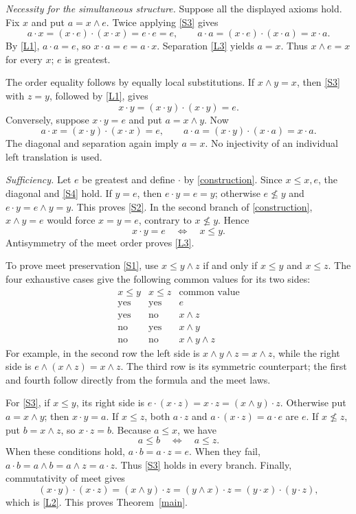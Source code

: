 \documentclass[11pt]{article}
\newcommand{\meet}{\wedge}
\newcommand{\dotop}{\mathbin{\cdot}}
\begin{document}
\medskip
\noindent\emph{Necessity for the simultaneous structure.}
Suppose all the displayed axioms hold. Fix \(x\) and put \(a=x\meet e\).
Twice applying \eqref{S3} gives
\[
a\dotop x=(x\dotop e)\dotop(x\dotop x)=e\dotop e=e,
\qquad
a\dotop a=(x\dotop e)\dotop(x\dotop a)=x\dotop a.
\]
By \eqref{L1}, \(a\dotop a=e\), so \(x\dotop a=e=a\dotop x\).
Separation \eqref{L3} yields \(a=x\). Thus \(x\meet e=x\) for every \(x\);
\(e\) is greatest.

The order equality follows by equally local substitutions. If \(x\meet y=x\),
then \eqref{S3} with \(z=y\), followed by \eqref{L1}, gives
\[
x\dotop y=(x\dotop y)\dotop(x\dotop y)=e.
\]
Conversely, suppose \(x\dotop y=e\) and put \(a=x\meet y\). Now
\[
a\dotop x=(x\dotop y)\dotop(x\dotop x)=e,
\qquad
a\dotop a=(x\dotop y)\dotop(x\dotop a)=x\dotop a.
\]
The diagonal and separation again imply \(a=x\). No injectivity of an
individual left translation is used.

\medskip
\noindent\emph{Sufficiency.}
Let \(e\) be greatest and define \(\dotop\) by \eqref{construction}.
Since \(x\leq x,e\), the diagonal and \eqref{S4} hold.
If \(y=e\), then \(e\dotop y=e=y\); otherwise \(e\not\leq y\) and
\(e\dotop y=e\meet y=y\). This proves \eqref{S2}.
In the second branch of \eqref{construction}, \(x\meet y=e\) would force
\(x=y=e\), contrary to \(x\not\leq y\). Hence
\[
x\dotop y=e\quad\Longleftrightarrow\quad x\leq y.
\]
Antisymmetry of the meet order proves \eqref{L3}.

To prove meet preservation \eqref{S1}, use
\(x\leq y\meet z\) if and only if \(x\leq y\) and \(x\leq z\).
The four exhaustive cases give the following common values for its two
sides:
\[
\begin{array}{c|c|c}
x\leq y&x\leq z&\text{common value}\\ \hline
\text{yes}&\text{yes}&e\\
\text{yes}&\text{no}&x\meet z\\
\text{no}&\text{yes}&x\meet y\\
\text{no}&\text{no}&x\meet y\meet z
\end{array}
\]
For example, in the second row the left side is
\(x\meet y\meet z=x\meet z\), while the right side is
\(e\meet(x\meet z)=x\meet z\). The third row is its symmetric counterpart;
the first and fourth follow directly from the formula and the meet laws.

For \eqref{S3}, if \(x\leq y\), its right side is
\(e\dotop(x\dotop z)=x\dotop z=(x\meet y)\dotop z\).
Otherwise put \(a=x\meet y\); then \(x\dotop y=a\).
If \(x\leq z\), both \(a\dotop z\) and \(a\dotop(x\dotop z)=a\dotop e\)
are \(e\). If \(x\not\leq z\), put \(b=x\meet z\), so \(x\dotop z=b\).
Because \(a\leq x\), we have
\[
a\leq b\quad\Longleftrightarrow\quad a\leq z.
\]
When these conditions hold, \(a\dotop b=a\dotop z=e\).
When they fail, \(a\dotop b=a\meet b=a\meet z=a\dotop z\).
Thus \eqref{S3} holds in every branch. Finally, commutativity of meet gives
\[
(x\dotop y)\dotop(x\dotop z)
=(x\meet y)\dotop z
=(y\meet x)\dotop z
=(y\dotop x)\dotop(y\dotop z),
\]
which is \eqref{L2}. This proves Theorem~\ref{main}.
\end{document}
